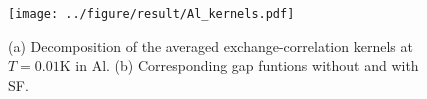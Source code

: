 %
%
%
\begin{figure}[h]
	\centering
	\texttt{[image: ../figure/result/Al\_kernels.pdf]}
	\caption{(a) Decomposition of the averaged exchange-correlation kernels
		at $T=0.01$K in Al. (b) Corresponding gap funtions without 
	and with SF.}
	\label{fig:Alaveker}
\end{figure}
%
%
%


